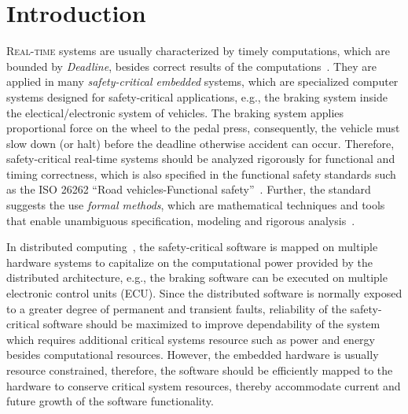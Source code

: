 \chapter{Introduction}\label{chapter_introduction}
\lettrine{R}{eal-time} systems are usually characterized by timely computations, which are bounded by \textit{Deadline}, besides correct results of the computations~\cite{Buttazzo2003HardApplications}. They are applied in many \textit{safety-critical embedded} systems, which are specialized computer systems designed for safety-critical applications, e.g., the braking system inside the electical/electronic system of vehicles. The braking system applies proportional force on the wheel to the pedal press, consequently, the vehicle must slow down (or halt) before the deadline otherwise accident can occur. Therefore, safety-critical real-time systems should be analyzed rigorously for functional and timing correctness, which is also specified in the functional safety standards such as the ISO 26262 ``Road vehicles-Functional safety''~\cite{iso201126262}. Further, the standard suggests the use \textit{formal methods}, which are mathematical techniques and tools that enable unambiguous specification, modeling and rigorous analysis~\cite{o2017concise}.

In distributed computing~\cite{}, the safety-critical software is mapped on multiple hardware systems to capitalize on the computational power provided by the distributed architecture, e.g., the braking software can be executed on multiple electronic control units (ECU). Since the distributed software is  normally exposed to a greater degree of permanent and transient faults, reliability of the safety-critical software should be maximized to improve dependability of the  system which requires additional critical systems resource such as power and energy besides computational resources. However, the embedded hardware is usually resource constrained, therefore, the software should be efficiently mapped to the hardware to conserve critical system resources, thereby accommodate current and future growth of the software functionality.

